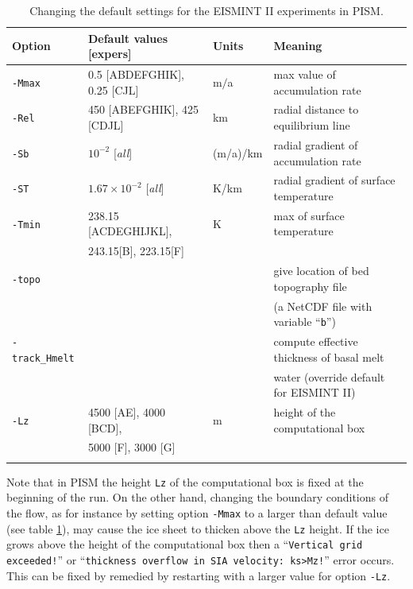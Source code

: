 \documentclass[11pt,final]{amsart}
\renewcommand{\t}[1]{\texttt{#1}}
\begin{document}
\begin{table}[h]
\caption{Changing the default settings for the EISMINT II experiments in PISM.}\label{tab:eisIIoptions}
\small
\begin{tabular}{@{}llll}\hline
\textbf{Option} & \textbf{Default values [expers]} & \textbf{Units} & \textbf{Meaning} \\ \hline
\verb|-Mmax| & 0.5 [ABDEFGHIK], 0.25 [CJL] & m$/$a & max value of accumulation rate \\
\verb|-Rel| & 450 [ABEFGHIK], 425 [CDJL] & km & radial distance to equilibrium line \\
\verb|-Sb| & $10^{-2}$ [\emph{all}] & (m/a)/km & radial gradient of accumulation rate \\
\verb|-ST| & $1.67 \times 10^{-2}$ [\emph{all}] & K/km & radial gradient of surface temperature\\
\verb|-Tmin| & 238.15 [ACDEGHIJKL], & K & max of surface temperature \\
 & 243.15[B], 223.15[F] & & \\
\verb|-topo| &  &  & give location of bed topography file  \\
 &  &  & (a NetCDF file with variable ``\t{b}'')  \\
\verb|-track_Hmelt| &  &  & compute effective thickness of basal melt \\
 &  &  & water (override default for EISMINT II) \\
\verb|-Lz| & 4500 [AE], 4000 [BCD], & m & height of the computational box \\
 & 5000 [F], 3000 [G] &  &  \\
\hline\normalsize
\end{tabular}\end{table}

Note that in PISM the height \verb|Lz| of the computational box is fixed at the beginning of the run.  On the other hand, changing the boundary conditions of the flow, as for instance by setting option \verb|-Mmax| to a larger than default value (see table \ref{tab:eisIIoptions}), may cause the ice sheet to thicken above the \verb|Lz| height.  If the ice grows above the height of the computational box then a ``\verb|Vertical grid exceeded!|'' or ``\verb|thickness overflow in SIA velocity: ks>Mz!|'' error occurs.  This can be fixed by remedied by restarting with a larger value for option \verb|-Lz|.
\end{document}
